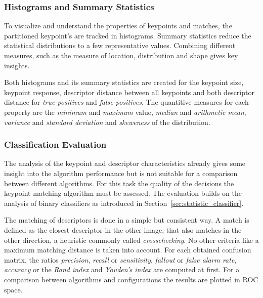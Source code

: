 \subsubsection{Histograms and Summary Statistics}

To visualize and understand the properties of keypoints and matches, the partitioned keypoint's are tracked in histograms.
Summary statistics reduce the statistical distributions to a few representative values.
Combining different measures, such as the measure of location, distribution and shape gives key insights.

Both histograms and its summary statistics are created for the keypoint size, keypoint response, descriptor distance between all keypoints and both descriptor distance for \emph{true-positives} and \emph{false-positives}.
The quantitive measures for each property are the \emph{minimum} and \emph{maximum} value, \emph{median} and \emph{arithmetic mean}, \emph{variance} and \emph{standard deviation} and \emph{skeweness} of the distribution.

\subsubsection{Classification Evaluation}

The analysis of the keypoint and descriptor characteristics already gives some insight into the algorithm performance but is not suitable for a comparison between different algorithms.
For this task the quality of the decisions the keypoint matching algorithm must be assessed.
The evaluation builds on the analysis of binary classifiers as introduced in Section~\ref{sec:statistic_classifier}.

The matching of descriptors is done in a simple but consistent way.
A match is defined as the closest descriptor in the other image, that also matches in the other direction, a heuristic commonly called \emph{crosschecking}.
No other criteria like a maximum matching distance is taken into account.
For each obtained confusion matrix, the ratios \emph{precision}, \emph{recall} or \emph{sensitivity}, \emph{fallout} or \emph{false alarm rate}, \emph{accuracy} or the \emph{Rand index} and \emph{Youden's index} are computed at first.
For a comparison between algorithms and configurations the results are plotted in \gls{ROC} space.
